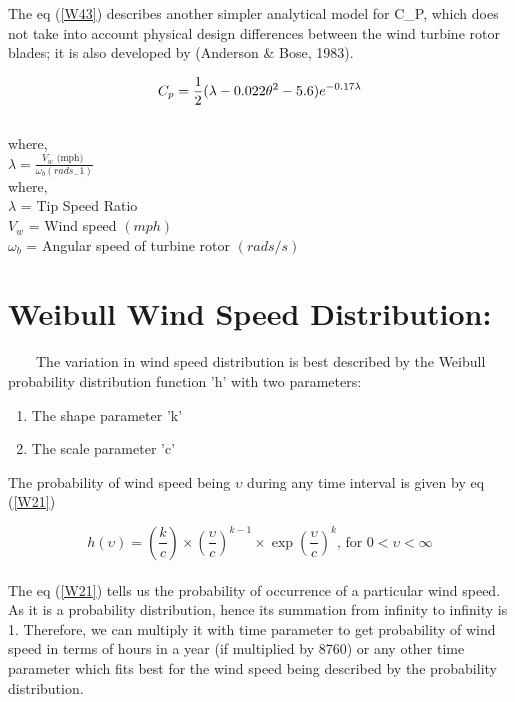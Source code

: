 The eq (\ref{W43}) describes another simpler analytical model for C_{P}, which does not take into account physical design differences between the wind turbine rotor blades; it is also developed by (Anderson & Bose, 1983).

\begin{equation}
\label{W43}
	C_p = \frac{1}{2}(\lambda - 0.022\theta ^2 - 5.6)e^{-0.17\lambda}\\
\end{equation}\\	
where,\\ 	
$\lambda = \frac{V_w \text{ (mph) }}{\omega _{b}  (rads_-1) }$\\
where,\\
$ \lambda $ = Tip Speed Ratio \\
$ V_w $ = Wind speed $ (mph) $  \\
$ \omega_b $ = Angular speed of turbine rotor $ (rads/s) $ \\      
    
\section{Weibull Wind Speed Distribution:}
\
\
\
\
The variation in wind speed distribution is best described by the Weibull probability distribution function 'h' with two parameters:

\begin{enumerate}
\item \blindtext The shape parameter 'k'
\item \blindtext The scale parameter 'c'
\end{enumerate}


The probability of wind speed being $\upsilon$ during any time interval is given by eq (\ref{W21})

\begin{equation}
\label{W21}
h(\upsilon) = \left(\frac{k}{c}\right) \times \left(\frac{\upsilon}{c}\right)^{k-1} \times \exp{\left(\frac{\upsilon}{c}\right)}^k \text{, for $0< \upsilon < \infty$}
\end{equation}\\

The eq (\ref{W21}) tells us the probability of occurrence of a particular wind speed. As it is a probability distribution, hence its summation from infinity to infinity is 1. Therefore, we can multiply it with time parameter to get probability of wind speed in terms of hours in a year (if multiplied by 8760) or any other time parameter which fits best for the wind speed being described by the probability distribution.\\

